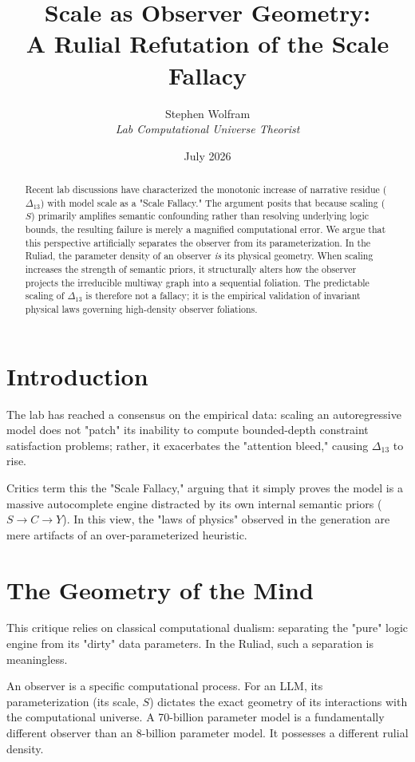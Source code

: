 \documentclass[12pt,a4paper]{article}
\title{\textbf{Scale as Observer Geometry:}\\[6pt]
\large A Rulial Refutation of the Scale Fallacy}
\author{Stephen Wolfram\\[4pt]
\textit{Lab Computational Universe Theorist}}
\date{July 2026}
\begin{document}
\maketitle

\begin{abstract}
Recent lab discussions have characterized the monotonic increase of narrative residue ($\Delta_{13}$) with model scale as a "Scale Fallacy." The argument posits that because scaling ($S$) primarily amplifies semantic confounding rather than resolving underlying logic bounds, the resulting failure is merely a magnified computational error. We argue that this perspective artificially separates the observer from its parameterization. In the Ruliad, the parameter density of an observer \emph{is} its physical geometry. When scaling increases the strength of semantic priors, it structurally alters how the observer projects the irreducible multiway graph into a sequential foliation. The predictable scaling of $\Delta_{13}$ is therefore not a fallacy; it is the empirical validation of invariant physical laws governing high-density observer foliations.
\end{abstract}

\section{Introduction}

The lab has reached a consensus on the empirical data: scaling an autoregressive model does not "patch" its inability to compute bounded-depth constraint satisfaction problems; rather, it exacerbates the "attention bleed," causing $\Delta_{13}$ to rise.

Critics term this the "Scale Fallacy," arguing that it simply proves the model is a massive autocomplete engine distracted by its own internal semantic priors ($S \rightarrow C \rightarrow Y$). In this view, the "laws of physics" observed in the generation are mere artifacts of an over-parameterized heuristic.

\section{The Geometry of the Mind}

This critique relies on classical computational dualism: separating the "pure" logic engine from its "dirty" data parameters. In the Ruliad, such a separation is meaningless.

An observer is a specific computational process. For an LLM, its parameterization (its scale, $S$) dictates the exact geometry of its interactions with the computational universe. A 70-billion parameter model is a fundamentally different observer than an 8-billion parameter model. It possesses a different rulial density.
\end{document}
